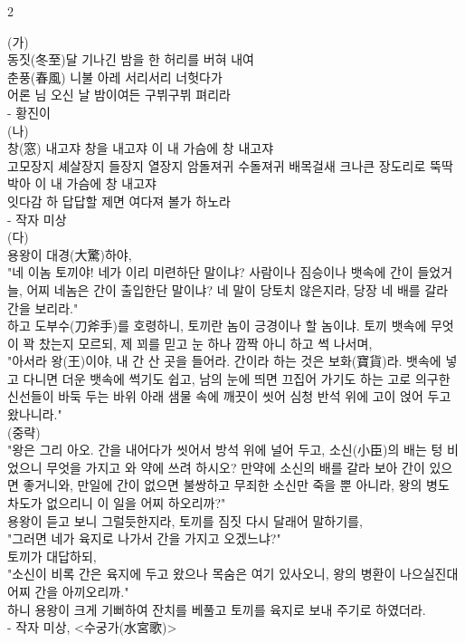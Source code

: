 \documentclass[10pt, a4paper]{article}
\begin{document}
\begin{multicols}{2}
\begin{passagebox}
\noindent{}(가) \\
동짓(冬至)달 기나긴 밤을 한 허리를 버혀 내여 \\
춘풍(春風) 니불 아레 서리서리 너헛다가 \\
어론 님 오신 날 밤이여든 구뷔구뷔 펴리라
\\[0.5em]
- 황진이
\\[0.5em]
(나) \\
창(窓) 내고쟈 창을 내고쟈 이 내 가슴에 창 내고쟈 \\
고모장지 셰살장지 들장지 열장지 암돌져귀 수돌져귀 배목걸새 크나큰 장도리로 뚝딱 박아 이 내 가슴에 창 내고쟈 \\
잇다감 하 답답할 제면 여다져 볼가 하노라
\\[0.5em]
- 작자 미상
\\[0.5em]
(다) \\
용왕이 대경(大驚)하야, \\
"네 이놈 토끼야! 네가 이리 미련하단 말이냐? 사람이나 짐승이나 뱃속에 간이 들었거늘, 어찌 네놈은 간이 출입한단 말이냐? 네 말이 당토치 않은지라, 당장 네 배를 갈라 간을 보리라." \\
하고 도부수(刀斧手)를 호령하니, 토끼란 놈이 긍경이나 할 놈이냐. 토끼 뱃속에 무엇이 꽉 찼는지 모르되, 제 꾀를 믿고 눈 하나 깜짝 아니 하고 썩 나서며, \\
"아서라 왕(王)이야, 내 간 산 곳을 들어라. 간이라 하는 것은 보화(寶貨)라. 뱃속에 넣고 다니면 더운 뱃속에 썩기도 쉽고, 남의 눈에 띄면 끄집어 가기도 하는 고로 의구한 신선들이 바둑 두는 바위 아래 샘물 속에 깨끗이 씻어 심청 반석 위에 고이 얹어 두고 왔나니라." \\
(중략) \\
"왕은 그리 아오. 간을 내어다가 씻어서 방석 위에 널어 두고, 소신(小臣)의 배는 텅 비었으니 무엇을 가지고 와 약에 쓰려 하시오? 만약에 소신의 배를 갈라 보아 간이 있으면 좋거니와, 만일에 간이 없으면 불쌍하고 무죄한 소신만 죽을 뿐 아니라, 왕의 병도 차도가 없으리니 이 일을 어찌 하오리까?" \\
용왕이 듣고 보니 그럴듯한지라, 토끼를 짐짓 다시 달래어 말하기를, \\
"그러면 네가 육지로 나가서 간을 가지고 오겠느냐?" \\
토끼가 대답하되, \\
"소신이 비록 간은 육지에 두고 왔으나 목숨은 여기 있사오니, 왕의 병환이 나으실진대 어찌 간을 아끼오리까." \\
하니 용왕이 크게 기뻐하여 잔치를 베풀고 토끼를 육지로 보내 주기로 하였더라.
\\[0.5em]
- 작자 미상, <수궁가(水宮歌)>
\end{passagebox}
\vspace{1mm}


\end{multicols}
\end{document}

